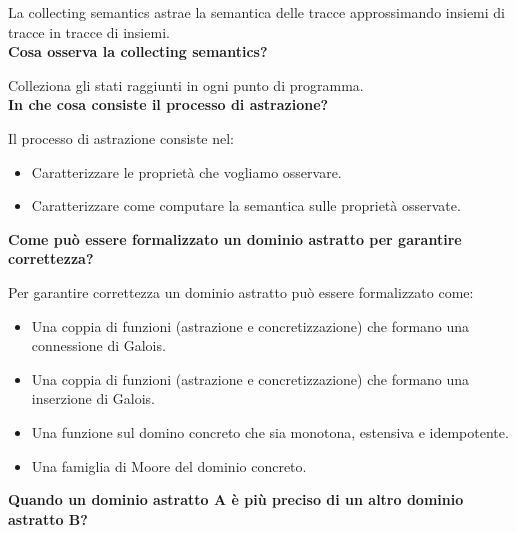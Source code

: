 \documentclass[a4paper,oneside,titlepage]{book}
\begin{document}
La collecting semantics astrae la semantica delle tracce approssimando insiemi di tracce in tracce di insiemi.
\bigskip
\\
\textbf{Cosa osserva la collecting semantics?}

Colleziona gli stati raggiunti in ogni punto di programma.
\bigskip
\\
\textbf{In che cosa consiste il processo di astrazione?}

Il processo di astrazione consiste nel:
\begin{itemize}
    \item Caratterizzare le proprietà che vogliamo osservare.
    \item Caratterizzare come computare la semantica sulle proprietà osservate.
\end{itemize}
\noindent
\textbf{Come può essere formalizzato un dominio astratto per garantire correttezza?}

Per garantire correttezza un dominio astratto può essere formalizzato come:
\begin{itemize}
    \item Una coppia di funzioni (astrazione e concretizzazione) che formano una connessione di Galois.
    \item Una coppia di funzioni (astrazione e concretizzazione) che formano una inserzione di Galois.
    \item Una funzione sul domino concreto che sia monotona, estensiva e idempotente.
    \item Una famiglia di Moore del dominio concreto.
\end{itemize}
\noindent
\textbf{Quando un dominio astratto A è più preciso di un altro dominio astratto B?}
\end{document}
